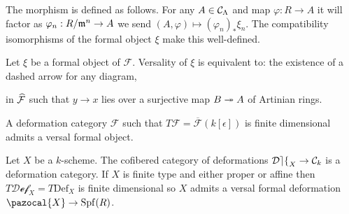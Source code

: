 \documentclass[12pt]{article}
\newcommand{\Def}{\mathrm{Def}}
\newcommand{\cDef}{\mathcal{Def}}
\renewcommand{\X}{\pazocal{X}}
\newcommand{\Spf}[1]{\mathrm{Spf} \! \left(#1 \right)}
\renewcommand{\F}{\mathcal{F}}
\begin{document}
\begin{rmk}
The morphism is defined as follows. For any $A \in \mathcal{C}_{\Lambda}$ and map $\varphi : R \to A$ it will factor as $\varphi_n : R / \mathfrak{m}^n \to A$ we send $(A, \varphi) \mapsto (\varphi_n)_* \xi_n$. The compatibility isomorphisms of the formal object $\xi$ make this well-defined. 
\end{rmk}

\begin{rmk}
Let $\xi$ be a formal object of $\F$. Versality of $\xi$ is equivalent to: the existence of a dashed arrow for any diagram,
\begin{center}
\end{center}
in $\wh{\F}$ such that $y \to x$ lies over a surjective map $B \twoheadrightarrow A$ of Artinian rings. 
\end{rmk}

\begin{theorem}
A deformation category $\F$ such that $T \F = \overline{\F}(k[\epsilon])$ is finite dimensional admits a versal formal object.
\end{theorem}

\begin{example}
Let $X$ be a $k$-scheme. The cofibered category of deformations $\cDef_X \to \C_{k}$ is a deformation category. If $X$ is finite type and either proper or affine then $T \cDef_X = T \Def_X$ is finite dimensional so $X$ admits a versal formal deformation $\X \to \Spf{R}$.
\end{example}
\end{document}

